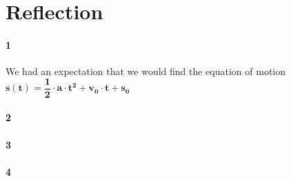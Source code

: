 \documentclass[main.tex]{subfiles}
\begin{document}
\clearpage
\section{Reflection}
\paragraph{1}
We had an expectation that we would find the equation of motion $\mathbf{s(t) = \dfrac{1}{2} \cdot a \cdot t^2 + v_0 \cdot t + s_0}$ 
\paragraph{2}
\paragraph{3}
\paragraph{4}
\end{document}
